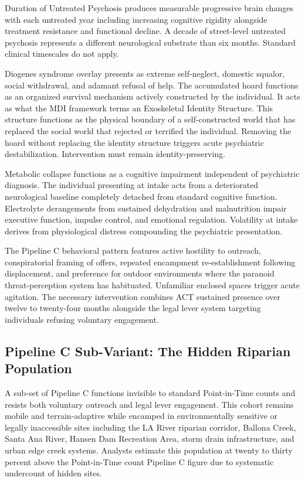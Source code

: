 \documentclass[12pt, letterpaper]{article}
\begin{document}
Duration of Untreated Psychosis produces measurable progressive brain changes with each untreated year including increasing cognitive rigidity alongside treatment resistance and functional decline. A decade of street-level untreated psychosis represents a different neurological substrate than six months. Standard clinical timescales do not apply.

Diogenes syndrome overlay presents as extreme self-neglect, domestic squalor, social withdrawal, and adamant refusal of help. The accumulated hoard functions as an organized survival mechanism actively constructed by the individual. It acts as what the MDI framework terms an Exoskeletal Identity Structure. This structure functions as the physical boundary of a self-constructed world that has replaced the social world that rejected or terrified the individual. Removing the hoard without replacing the identity structure triggers acute psychiatric destabilization. Intervention must remain identity-preserving.

Metabolic collapse functions as a cognitive impairment independent of psychiatric diagnosis. The individual presenting at intake acts from a deteriorated neurological baseline completely detached from standard cognitive function. Electrolyte derangements from sustained dehydration and malnutrition impair executive function, impulse control, and emotional regulation. Volatility at intake derives from physiological distress compounding the psychiatric presentation.

The Pipeline C behavioral pattern features active hostility to outreach, conspiratorial framing of offers, repeated encampment re-establishment following displacement, and preference for outdoor environments where the paranoid threat-perception system has habituated. Unfamiliar enclosed spaces trigger acute agitation. The necessary intervention combines ACT sustained presence over twelve to twenty-four months alongside the legal lever system targeting individuals refusing voluntary engagement.

\subsection{Pipeline C Sub-Variant: The Hidden Riparian Population}

A sub-set of Pipeline C functions invisible to standard Point-in-Time counts and resists both voluntary outreach and legal lever engagement. This cohort remains mobile and terrain-adaptive while encamped in environmentally sensitive or legally inaccessible sites including the LA River riparian corridor, Ballona Creek, Santa Ana River, Hansen Dam Recreation Area, storm drain infrastructure, and urban edge creek systems. Analysts estimate this population at twenty to thirty percent above the Point-in-Time count Pipeline C figure due to systematic undercount of hidden sites.
\end{document}
